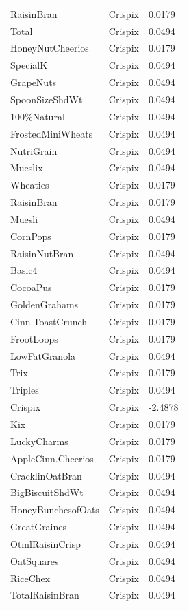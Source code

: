 \begin{table}[!htbp]
\begin{tabular}{lll}
\\
RaisinBran & Crispix & 0.0179
\\
Total & Crispix & 0.0494
\\
HoneyNutCheerios & Crispix & 0.0179
\\
SpecialK & Crispix & 0.0494
\\
GrapeNuts & Crispix & 0.0494
\\
SpoonSizeShdWt & Crispix & 0.0494
\\
100\%Natural & Crispix & 0.0494
\\
FrostedMiniWheats & Crispix & 0.0494
\\
NutriGrain & Crispix & 0.0494
\\
Mueslix & Crispix & 0.0494
\\
Wheaties & Crispix & 0.0179
\\
RaisinBran & Crispix & 0.0179
\\
Muesli & Crispix & 0.0494
\\
CornPops & Crispix & 0.0179
\\
RaisinNutBran & Crispix & 0.0494
\\
Basic4 & Crispix & 0.0494
\\
CocoaPus & Crispix & 0.0179
\\
GoldenGrahams & Crispix & 0.0179
\\
Cinn.ToastCrunch & Crispix & 0.0179
\\
FrootLoops & Crispix & 0.0179
\\
LowFatGranola & Crispix & 0.0494
\\
Trix & Crispix & 0.0179
\\
Triples & Crispix & 0.0494
\\
Crispix & Crispix & -2.4878
\\
Kix & Crispix & 0.0179
\\
LuckyCharms & Crispix & 0.0179
\\
AppleCinn.Cheerios & Crispix & 0.0179
\\
CracklinOatBran & Crispix & 0.0494
\\
BigBiscuitShdWt & Crispix & 0.0494
\\
HoneyBunchesofOats & Crispix & 0.0494
\\
GreatGraines & Crispix & 0.0494
\\
OtmlRaisinCrisp & Crispix & 0.0494
\\
OatSquares & Crispix & 0.0494
\\
RiceChex & Crispix & 0.0494
\\
TotalRaisinBran & Crispix & 0.0494
\\

\end{tabular}
\end{table}
